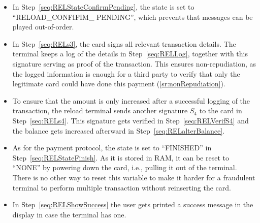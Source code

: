 \documentclass{article}
\begin{document}
    \begin{itemize}

    \item In Step~\ref{seq:RELStateConfirmPending}, the state is set to ``RELOAD\_CONFIFIM\_ PENDING'', which prevents that messages can be played out-of-order.


    \item In Step~\ref{seq:RELs3}, the card signs all relevant transaction details.
    The terminal keeps a log of the details in Step~\ref{seq:RELLog}, together with this signature serving as proof of the transaction.
    This ensures non-repudiation, as the logged information is enough for a third party to verify that only the legitimate card could have done this payment (\ref{sr:nonRepudiation}).

    \item To ensure that the amount is only increased after a successful logging of the  transaction, the reload terminal sends another signature $S_4$ to the card in Step~\ref{seq:RELs4}.
    This signature gets verified in Step~\ref{seq:RELVerifS4} and the balance gets increased afterward in Step~\ref{seq:RELalterBalance}.

    \item As for the payment protocol, the state is set to ``FINISHED'' in Step~\ref{seq:RELStateFinish}.
    As it is stored in RAM, it can be reset to ``NONE'' by powering down the card, i.e., pulling it out of the terminal.
    There is no other way to reset this variable to make it harder for a fraudulent terminal to perform multiple transaction without reinserting the card.

    \item In Step~\ref{seq:RELShowSuccess} the user gets printed a success message in the display in case the terminal has one.
\end{itemize}
\end{document}
